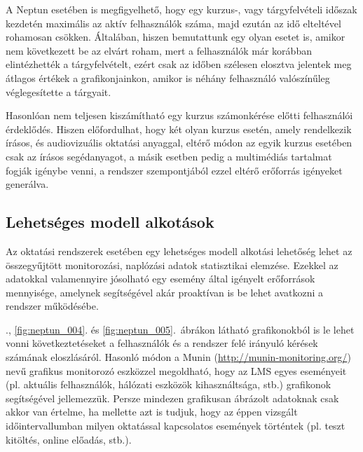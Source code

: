 A Neptun esetében is megfigyelhető, hogy egy kurzus-, vagy tárgyfelvételi időszak kezdetén maximális az aktív felhasználók száma, majd ezután az idő elteltével rohamosan csökken. Általában, hiszen bemutattunk egy olyan esetet is, amikor nem következett be az elvárt roham, mert a felhasználók már korábban elintézhették a tárgyfelvételt, ezért csak az időben szélesen elosztva jelentek meg átlagos értékek a grafikonjainkon, amikor is néhány felhasználó valószínűleg véglegesítette a tárgyait.

Hasonlóan nem teljesen kiszámítható egy kurzus számonkérése előtti felhasználói érdeklődés. Hiszen előfordulhat, hogy két olyan kurzus esetén, amely rendelkezik írásos, és audiovizuális oktatási anyaggal, eltérő módon az egyik kurzus esetében csak az írásos segédanyagot, a másik esetben pedig a multimédiás tartalmat fogják igénybe venni, a rendszer szempontjából ezzel eltérő erőforrás igényeket generálva.

\subsection{Lehetséges modell alkotások}

Az oktatási rendszerek esetében egy lehetséges modell alkotási lehetőség lehet az összegyűjtött monitorozási, naplózási adatok statisztikai elemzése. Ezekkel az adatokkal valamennyire jósolható egy esemény által igényelt erőforrások mennyisége, amelynek segítségével akár proaktívan is be lehet avatkozni a rendszer működésébe.

., \ref{fig:neptun_004}. és \ref{fig:neptun_005}.~ábrákon látható grafikonokból is le lehet vonni következtetéseket a felhasználók és a rendszer felé irányuló kérések számának eloszlásáról. Hasonló módon a Munin (\href{http://munin-monitoring.org/}{http://munin-monitoring.org/}) nevű grafikus monitorozó eszközzel megoldható, hogy az LMS egyes eseményeit (pl. aktuális felhasználók, hálózati eszközök kihasználtsága, stb.) grafikonok segítségével jellemezzük. Persze mindezen grafikusan ábrázolt adatoknak csak akkor van értelme, ha mellette azt is tudjuk, hogy az éppen vizsgált időintervallumban milyen oktatással kapcsolatos események történtek (pl. teszt kitöltés, online előadás, stb.). 
